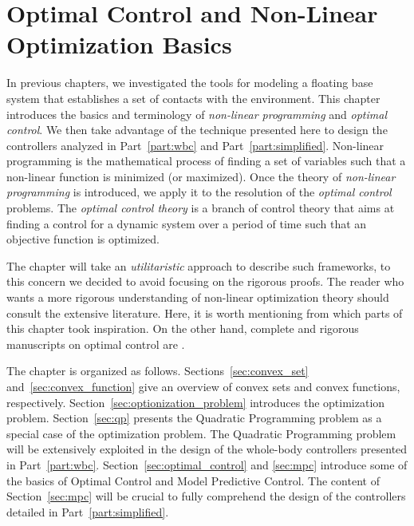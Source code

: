 \chapter{Optimal Control and Non-Linear Optimization Basics\label{chapter:optimization}}

\ifpdf
    \graphicspath{{ChapterOptimizationIntroduction/figures/Raster/}{ChapterOptimizationIntroduction/figures/PDF/}{ChapterOptimizationIntroduction/figures/}}
\else
    \graphicspath{{ChapterOptimizationIntroduction/figures/Vector/}{ChapterOptimizationIntroduction/figures/}}
\fi

In previous chapters, we investigated the tools for modeling a floating base system that establishes a set of contacts with the environment. This chapter introduces the basics and terminology of \emph{non-linear programming} and \emph{optimal control}. We then take advantage of the technique presented here to design the controllers analyzed in Part~\ref{part:wbc} and Part~\ref{part:simplified}.
Non-linear programming is the mathematical process of finding a set of variables such that a non-linear function is minimized (or maximized). Once the theory of \emph{non-linear programming} is introduced, we apply it to the resolution of the \emph{optimal control} problems. 
The \emph{optimal control theory} is a branch of control theory that aims at finding a control for a dynamic system over a period of time such that an objective function is optimized.
\par
The chapter will take an \emph{utilitaristic} approach to describe such frameworks, to this concern we decided to avoid focusing on the rigorous proofs. The reader who wants a more rigorous understanding of non-linear optimization theory should consult the extensive literature. Here, it is worth mentioning \citep{Boyd2004ConvexOptimization,Chachuat2007NonlinearPractice,diehl2009efficient} from which parts of this chapter took inspiration. On the other hand, complete and rigorous manuscripts on optimal control are \citep{Boyd2004ConvexOptimization,bemporad2002hybrid,Qin2000AnApplications,Biral2016NotesProblems,Allgower1999NonlinearOverview}.
\par
The chapter is organized as follows.
Sections~\ref{sec:convex_set} and~\ref{sec:convex_function} give an overview of convex sets and convex functions, respectively. Section~\ref{sec:optionization_problem} introduces the optimization problem. Section~\ref{sec:qp} presents the Quadratic Programming problem as a special case of the optimization problem. The Quadratic Programming problem will be extensively exploited in the design of the whole-body controllers presented in Part~\ref{part:wbc}.  Section~\ref{sec:optimal_control} and \ref{sec:mpc} introduce some of the basics of Optimal Control and Model Predictive Control. The content of Section~\ref{sec:mpc} will be crucial to fully comprehend the design of the controllers detailed in Part~\ref{part:simplified}.







